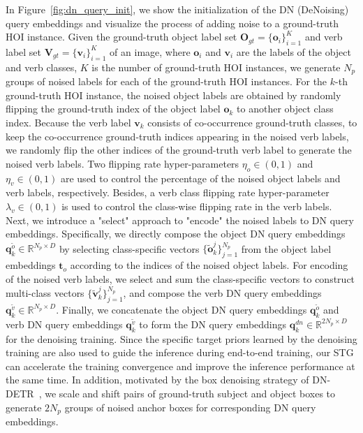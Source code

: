 \documentclass[10pt,twocolumn,letterpaper]{article}
\begin{document}
\quad In Figure~\ref{fig:dn_query_init}, we show the initialization of the DN (DeNoising) query embeddings and visualize the process of adding noise to a ground-truth HOI instance.
Given the ground-truth object label set $\bm{O}_{gt}=\{\bm{o}_i\}_{i=1}^K$ and verb label set $\bm{V}_{gt}=\{\bm{v}_i\}_{i=1}^K$ of an image, where $\bm{o}_i$ and $\bm{v}_i$ are the labels of the object and verb classes, $K$ is the number of ground-truth HOI instances, we generate $N_p$ groups of noised labels for each of the ground-truth HOI instances.
For the $k$-th ground-truth HOI instance, the noised object labels are obtained by randomly flipping the ground-truth index of the object label $\bm{o}_k$ to another object class index.
Because the verb label $\bm{v}_k$ consists of co-occurrence ground-truth classes, to keep the co-occurrence ground-truth indices appearing in the noised verb labels, we randomly flip the other indices of the ground-truth verb label to generate the noised verb labels.
Two flipping rate hyper-parameters $\eta_o\in(0,1)$ and $\eta_v\in(0,1)$ are used to control the percentage of the noised object labels and verb labels, respectively.
Besides, a verb class flipping rate hyper-parameter $\lambda_v\in(0,1)$ is used to control the class-wise flipping rate in the verb labels.
Next, we introduce a "select" approach to "encode" the noised labels to DN query embeddings.
Specifically, we directly compose the object DN query embeddings $\bm{q}^{\tilde{o}}_k\in\mathbb{R}^{N_p\times D}$ by selecting class-specific vectors $\{\tilde{\bm{o}}^j_k\}_{j=1}^{N_p}$ from the object label embeddings $\bm{t}_o$ according to the indices of the noised object labels.
For encoding of the noised verb labels, we select and sum the class-specific vectors to construct multi-class vectors $\{\tilde{\bm{v}}^j_k\}_{j=1}^{N_p}$, and compose the verb DN query embeddings $\bm{q}^{\tilde{v}}_k\in\mathbb{R}^{N_p\times D}$.
Finally, we concatenate the object DN query embeddings $\bm{q}^{\tilde{o}}_k$ and verb DN query embeddings $\bm{q}^{\tilde{v}}_k$ to form the DN query embeddings $\bm{q}^{dn}_k\in\mathbb{R}^{2N_p\times D}$ for the denoising training.
Since the specific target priors learned by the denoising training are also used to guide the inference during end-to-end training, our STG can accelerate the training convergence and improve the inference performance at the same time.
In addition, motivated by the box denoising strategy of DN-DETR~\cite{Li_2022_CVPR}, we scale and shift pairs of ground-truth subject and object boxes to generate $2N_p$ groups of noised anchor boxes for corresponding DN query embeddings.
\end{document}
